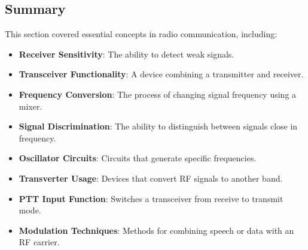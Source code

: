 
\subsection*{Summary}
This section covered essential concepts in radio communication, including:
\begin{itemize}
    \item \textbf{Receiver Sensitivity}: The ability to detect weak signals.
    \item \textbf{Transceiver Functionality}: A device combining a transmitter and receiver.
    \item \textbf{Frequency Conversion}: The process of changing signal frequency using a mixer.
    \item \textbf{Signal Discrimination}: The ability to distinguish between signals close in frequency.
    \item \textbf{Oscillator Circuits}: Circuits that generate specific frequencies.
    \item \textbf{Transverter Usage}: Devices that convert RF signals to another band.
    \item \textbf{PTT Input Function}: Switches a transceiver from receive to transmit mode.
    \item \textbf{Modulation Techniques}: Methods for combining speech or data with an RF carrier.
\end{itemize}
